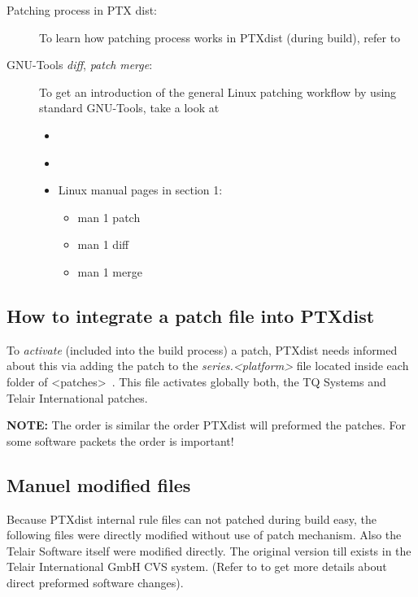 \begin{description}
    \item[Patching process in PTX dist:]
        To learn how patching process works in PTXdist (during build), refer
        to~\cite{ptxdist_manual}
    \item[GNU-Tools \textit{diff},  \textit{patch} \textit{merge}:] To get an
        introduction of the general Linux patching workflow by using
        standard GNU-Tools, take a look at
        \begin{itemize}
            \item~\cite[GNU Diff and Patch]{GNGNUUpatchDiff}
            \item~\cite[GNU Merge]{GNUmerge}
            \item Linux manual pages in section 1:
                \begin{itemize}
                    \item man 1 patch
                    \item man 1 diff
                    \item man 1 merge
                \end{itemize}
        \end{itemize}
\end{description}


\subsection{How to integrate a patch file into PTXdist}%
\label{sec:integrate_patch}
To \textit{activate} (included into the build process) a patch, PTXdist needs
informed about this via adding the patch to the \textit{series.<platform>}
file located inside each folder of <patches>~\footnotemark[2]. This file
activates globally both, the TQ Systems and Telair International patches.

\textbf{NOTE:} The order is similar the order PTXdist
will preformed the patches. For some software packets the order is important!



\subsection{Manuel modified files}%
\label{sec:manuel_modified_files}

Because PTXdist internal rule files can not patched during build easy, the
following files were directly modified without use of patch mechanism. Also the
Telair Software itself were modified directly. The original version till exists
in the Telair International GmbH \gls{CVS} system. (Refer to
 to get more details about direct preformed software changes).

